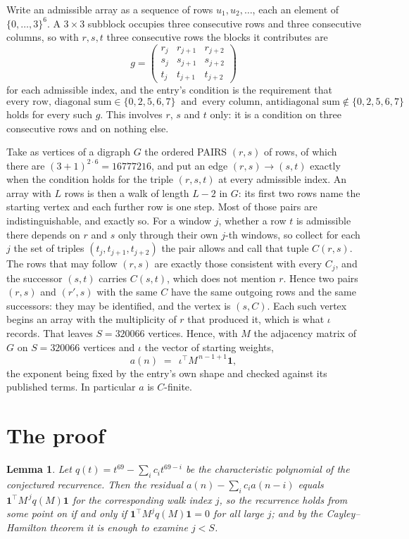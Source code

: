 \documentclass[11pt,a4paper]{article}
\theoremstyle{plain}
\newtheorem{lemma}[theorem]{Lemma}
\theoremstyle{definition}
\begin{document}
Write an admissible array as a sequence of rows $u_1,u_2,\dots$, each an element of
$\{0,\dots,3\}^{6}$. A $3\times3$ subblock occupies three consecutive rows and
three consecutive columns, so with $r,s,t$ three consecutive rows the blocks it
contributes are
\[
g=\begin{pmatrix}r_j&r_{j+1}&r_{j+2}\\ s_j&s_{j+1}&s_{j+2}\\ t_j&t_{j+1}&t_{j+2}\end{pmatrix}
\]
for each admissible index, and the entry's condition is the requirement that
\[
\text{every row, diagonal sum} \in \{0,2,5,6,7\}\ \text{ and }\ \text{every column, antidiagonal sum} \notin \{0,2,5,6,7\}
\]
holds for every such $g$. This involves $r$, $s$ and $t$ only: it is a condition on
three consecutive rows and on nothing else.

Take as vertices of a digraph $G$ the ordered PAIRS $(r,s)$ of rows, of which there are
$(3+1)^{2\cdot6}=16777216$, and put an edge $(r,s)\to(s,t)$ exactly when the condition
holds for the triple $(r,s,t)$ at every admissible index. An array with $L$ rows is then a
walk of length $L-2$ in $G$: its first two rows name the starting vertex and each further
row is one step. Most of those pairs are indistinguishable, and exactly so. For a window $j$, whether a row $t$ is admissible there depends on $r$ and $s$ only through their own $j$-th windows, so collect for each $j$ the set of triples $(t_j,t_{j+1},t_{j+2})$ the pair allows and call that tuple $C(r,s)$. The rows that may follow $(r,s)$ are exactly those consistent with every $C_j$, and the successor $(s,t)$ carries $C(s,t)$, which does not mention $r$. Hence two pairs $(r,s)$ and $(r',s)$ with the same $C$ have the same outgoing rows and the same successors: they may be identified, and the vertex is $(s,C)$. Each such vertex begins an array with the multiplicity of $r$ that produced it, which is what $\iota$ records. That leaves $S=320066$ vertices. Hence, with $M$ the adjacency matrix of $G$ on $S=320066$ vertices and
$\iota$ the vector of starting weights,
\[
a(n)\;=\;\,\iota^{\!\top}M^{\,n-1+1}\mathbf{1},
\]
the exponent being fixed by the entry's own shape and checked against its published terms.
In particular $a$ is $C$-finite.

\section{The proof}

\begin{lemma}\label{lem:crit}
Let $q(t)=t^{69}-\sum_i c_it^{69-i}$ be the characteristic polynomial of the
conjectured recurrence. Then the residual $a(n)-\sum_ic_ia(n-i)$ equals
$\mathbf{1}^{\!\top}M^{\,j}q(M)\mathbf{1}$ for the corresponding walk index
$j$, so the recurrence holds from some point on if and only if
$\mathbf{1}^{\!\top}M^{j}q(M)\mathbf{1}=0$ for all large $j$; and by the
Cayley--Hamilton theorem it is enough to examine $j<S$.
\end{lemma}
\end{document}
